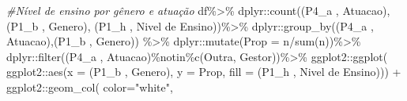 \documentclass[
]{article}
\newenvironment{Shaded}{\begin{snugshade}}{\end{snugshade}}
\newcommand{\AttributeTok}[1]{\textcolor[rgb]{0.77,0.63,0.00}{#1}}
\newcommand{\CommentTok}[1]{\textcolor[rgb]{0.56,0.35,0.01}{\textit{#1}}}
\newcommand{\FunctionTok}[1]{\textcolor[rgb]{0.00,0.00,0.00}{#1}}
\newcommand{\NormalTok}[1]{#1}
\newcommand{\SpecialCharTok}[1]{\textcolor[rgb]{0.00,0.00,0.00}{#1}}
\newcommand{\StringTok}[1]{\textcolor[rgb]{0.31,0.60,0.02}{#1}}
\begin{document}
\begin{Shaded}
\begin{Highlighting}[]
\CommentTok{\#Nível de ensino por gênero e atuação}
\NormalTok{df}\SpecialCharTok{\%\textgreater{}\%}
\NormalTok{  dplyr}\SpecialCharTok{::}\FunctionTok{count}\NormalTok{(}\StringTok{\textasciigrave{}}\AttributeTok{(\textquotesingle{}P4\_a \textquotesingle{}, \textquotesingle{}Atuacao\textquotesingle{})}\StringTok{\textasciigrave{}}\NormalTok{,}\StringTok{\textasciigrave{}}\AttributeTok{(\textquotesingle{}P1\_b \textquotesingle{}, \textquotesingle{}Genero\textquotesingle{})}\StringTok{\textasciigrave{}}\NormalTok{, }\StringTok{\textasciigrave{}}\AttributeTok{(\textquotesingle{}P1\_h \textquotesingle{}, \textquotesingle{}Nivel de Ensino\textquotesingle{})}\StringTok{\textasciigrave{}}\NormalTok{)}\SpecialCharTok{\%\textgreater{}\%}
\NormalTok{  dplyr}\SpecialCharTok{::}\FunctionTok{group\_by}\NormalTok{(}\StringTok{\textasciigrave{}}\AttributeTok{(\textquotesingle{}P4\_a \textquotesingle{}, \textquotesingle{}Atuacao\textquotesingle{})}\StringTok{\textasciigrave{}}\NormalTok{,}\StringTok{\textasciigrave{}}\AttributeTok{(\textquotesingle{}P1\_b \textquotesingle{}, \textquotesingle{}Genero\textquotesingle{})}\StringTok{\textasciigrave{}}\NormalTok{) }\SpecialCharTok{\%\textgreater{}\%}
\NormalTok{  dplyr}\SpecialCharTok{::}\FunctionTok{mutate}\NormalTok{(}\AttributeTok{Prop =}\NormalTok{ n}\SpecialCharTok{/}\FunctionTok{sum}\NormalTok{(n))}\SpecialCharTok{\%\textgreater{}\%}
\NormalTok{  dplyr}\SpecialCharTok{::}\FunctionTok{filter}\NormalTok{(}\StringTok{\textasciigrave{}}\AttributeTok{(\textquotesingle{}P4\_a \textquotesingle{}, \textquotesingle{}Atuacao\textquotesingle{})}\StringTok{\textasciigrave{}}\SpecialCharTok{\%notin\%}\FunctionTok{c}\NormalTok{(}\StringTok{\textquotesingle{}Outra\textquotesingle{}}\NormalTok{, }\StringTok{\textquotesingle{}Gestor\textquotesingle{}}\NormalTok{))}\SpecialCharTok{\%\textgreater{}\%}
\NormalTok{  ggplot2}\SpecialCharTok{::}\FunctionTok{ggplot}\NormalTok{(}
\NormalTok{    ggplot2}\SpecialCharTok{::}\FunctionTok{aes}\NormalTok{(}\AttributeTok{x =} \StringTok{\textasciigrave{}}\AttributeTok{(\textquotesingle{}P1\_b \textquotesingle{}, \textquotesingle{}Genero\textquotesingle{})}\StringTok{\textasciigrave{}}\NormalTok{, }\AttributeTok{y =}\NormalTok{ Prop,}
                 \AttributeTok{fill =} \StringTok{\textasciigrave{}}\AttributeTok{(\textquotesingle{}P1\_h \textquotesingle{}, \textquotesingle{}Nivel de Ensino\textquotesingle{})}\StringTok{\textasciigrave{}}\NormalTok{)) }\SpecialCharTok{+}
\NormalTok{  ggplot2}\SpecialCharTok{::}\FunctionTok{geom\_col}\NormalTok{( }\AttributeTok{color=}\StringTok{"white"}\NormalTok{,}

\end{Highlighting}
\end{Shaded}
\end{document}
